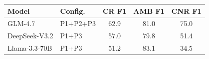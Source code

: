\begin{tabular}{llccc}
\toprule
\textbf{Model} & \textbf{Config.} & \textbf{CR F1} & \textbf{AMB F1} & \textbf{CNR F1} \\
\midrule
GLM-4.7 & P1+P2+P3 & 62.9 & 81.0 & 75.0 \\
DeepSeek-V3.2 & P1+P3 & 57.0 & 79.8 & 51.4 \\
Llama-3.3-70B & P1+P3 & 51.2 & 83.1 & 34.5 \\
\bottomrule
\end{tabular}
